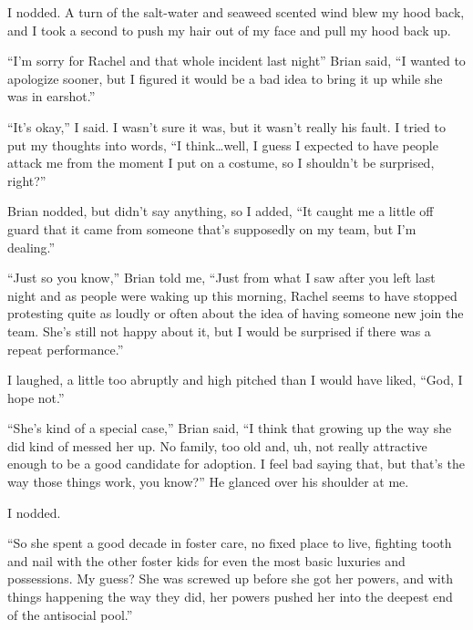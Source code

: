 I nodded.  A turn of the salt-water and seaweed scented wind blew my hood back, and I took a second to push my hair out of my face and pull my hood back up.



``I'm sorry for Rachel and that whole incident last night'' Brian said, ``I wanted to apologize sooner, but I figured it would be a bad idea to bring it up while she was in earshot.''



``It's okay,'' I said.  I wasn't sure it was, but it wasn't really his fault.  I tried to put my thoughts into words, ``I think\ldots well, I guess I expected to have people attack me from the moment I put on a costume, so I shouldn't be surprised, right?''



Brian nodded, but didn't say anything, so I added, ``It caught me a little off guard that it came from someone that's supposedly on my team, but I'm dealing.''



``Just so you know,'' Brian told me, ``Just from what I saw after you left last night and as people were waking up this morning, Rachel seems to have stopped protesting quite as loudly or often about the idea of having someone new join the team.  She's still not happy about it, but I would be surprised if there was a repeat performance.''



I laughed, a little too abruptly and high pitched than I would have liked, ``God, I hope not.''



``She's kind of a special case,'' Brian said, ``I think that growing up the way she did kind of messed her up.  No family, too old and, uh, not really attractive enough to be a good candidate for adoption.  I feel bad saying that, but that's the way those things work, you know?''  He glanced over his shoulder at me.



I nodded.



``So she spent a good decade in foster care, no fixed place to live, fighting tooth and nail with the other foster kids for even the most basic luxuries and possessions.  My guess?  She was screwed up before she got her powers, and with things happening the way they did, her powers pushed her into the deepest end of the antisocial pool.''



